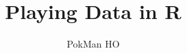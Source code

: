\documentclass{article}
\title{Playing Data in R}
\author{PokMan HO}
\date{}
\begin{document}
\maketitle
\tableofcontents
\clearpage











\nocite{*}\printbibliography
\end{document}
